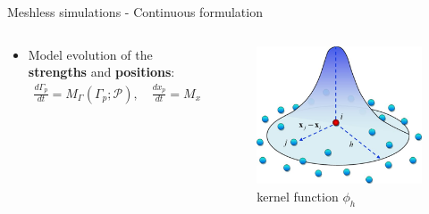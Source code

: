 \documentclass[aspectratio=169]{beamer} %
\begin{document}
\begin{frame}{Meshless simulations - Continuous formulation}
\begin{columns}[t]
\begin{column}{0.7\textwidth}
\begin{itemize}
                \item Model evolution of the \textbf{strengths} and \textbf{positions}:
                      \begin{eqnarray*}
                          \frac{d\Gamma_p}{dt} = M_\Gamma(\Gamma_p; \mathcal P), \quad \frac{d x_p}{d t} = M_x(x_p; \mathcal P)
                      \end{eqnarray*}
            \end{itemize}
        \end{column}
        \begin{column}{0.3\textwidth}
            \begin{figure}
                \includegraphics[width=\textwidth]{images/kernel.png}
                \caption*{ kernel function $\phi_h$}
            \end{figure}
        \end{column}
    \end{columns}
\end{frame}
\end{document}
